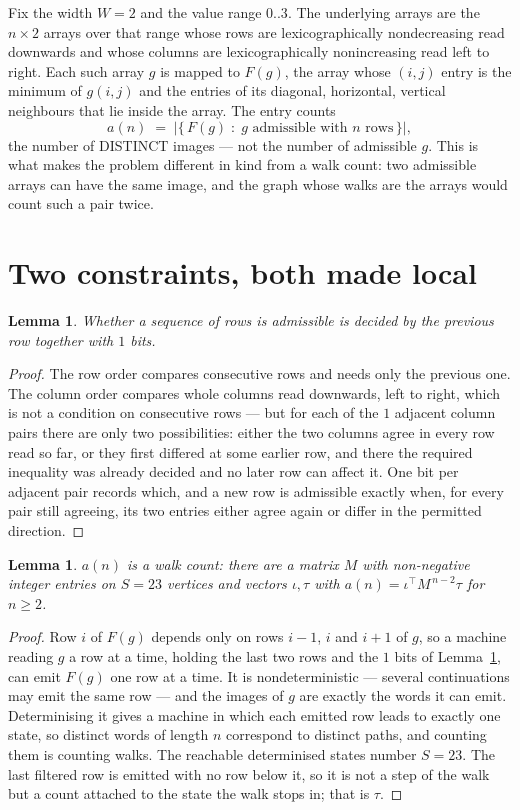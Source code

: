 \documentclass[11pt,a4paper]{article}
\theoremstyle{plain}
\newtheorem{lemma}[theorem]{Lemma}
\theoremstyle{definition}
\begin{document}
Fix the width $W=2$ and the value range $0..3$. The underlying arrays are the
$n\times2$ arrays over that range whose rows are lexicographically nondecreasing read downwards
and whose columns are lexicographically nonincreasing read left to right. Each such array $g$
is mapped to $F(g)$, the array whose $(i,j)$ entry is the minimum of $g(i,j)$ and the entries
of its diagonal, horizontal, vertical neighbours that lie inside the array. The entry counts
\[
a(n)\;=\;\bigl|\{\,F(g)\;:\;g\text{ admissible with }n\text{ rows}\,\}\bigr|,
\]
the number of DISTINCT images --- not the number of admissible $g$. This is what makes the
problem different in kind from a walk count: two admissible arrays can have the same image, and
the graph whose walks are the arrays would count such a pair twice.

\section{Two constraints, both made local}

\begin{lemma}\label{lem:local}
Whether a sequence of rows is admissible is decided by the previous row together with
$1$ bits.
\end{lemma}

\begin{proof}
The row order compares consecutive rows and needs only the previous one. The column order
compares whole columns read downwards, left to right, which is not a condition on consecutive
rows --- but for each of the $1$ adjacent column pairs there are only two possibilities:
either the two columns agree in every row read so far, or they first differed at some earlier
row, and there the required inequality was already decided and no later row can affect it. One
bit per adjacent pair records which, and a new row is admissible exactly when, for every pair
still agreeing, its two entries either agree again or differ in the permitted direction.
\end{proof}

\begin{lemma}\label{lem:det}
$a(n)$ is a walk count: there are a matrix $M$ with non-negative integer entries on $S=23$
vertices and vectors $\iota,\tau$ with $a(n)=\iota^{\!\top}M^{\,n-2}\tau$ for $n\ge2$.
\end{lemma}

\begin{proof}
Row $i$ of $F(g)$ depends only on rows $i-1$, $i$ and $i+1$ of $g$, so a machine reading $g$ a
row at a time, holding the last two rows and the $1$ bits of Lemma~\ref{lem:local}, can
emit $F(g)$ one row at a time. It is nondeterministic --- several continuations may emit the
same row --- and the images of $g$ are exactly the words it can emit. Determinising it gives a
machine in which each emitted row leads to exactly one state, so distinct words of length $n$
correspond to distinct paths, and counting them is counting walks. The reachable determinised
states number $S=23$. The last filtered row is emitted with no row below it, so it is not a
step of the walk but a count attached to the state the walk stops in; that is $\tau$.
\end{proof}
\end{document}
